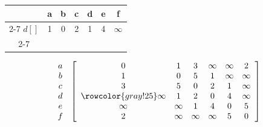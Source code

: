 \documentclass[12pt,a4paper]{article}
\begin{document}
\begin{minipage}{0.45\textwidth}
\centering

\begin{tabular}{ccccccc}
  & a & b & c & d & e & f \\
\cline{2-7}
$d[]$ & \multicolumn{1}{|c|}{1} & \multicolumn{1}{|c|}{0} & \multicolumn{1}{|c|}{2} & \multicolumn{1}{|c|}{1} & \multicolumn{1}{|c|}{4} & \multicolumn{1}{|c|}{$\infty$} \\
\cline{2-7}
\end{tabular}


\vspace{0.5em}

\[
\begin{array}{c}
a \\ b \\ c \\ d \\ e \\ f
\end{array}
\;
\left[
\begin{array}{cccccc}
0 & 1 & 3 & \infty & \infty & 2 \\
1 & 0 & 5 & 1 & \infty & \infty \\
3 & 5 & 0 & 2 & 1 & \infty \\
\rowcolor{gray!25}
\infty & 1 & 2 & 0 & 4 & \infty \\
\infty & \infty & 1 & 4 & 0 & 5 \\
2 & \infty & \infty & \infty & 5 & 0
\end{array}
\right]
\]
\end{minipage}
\vspace{3cm}
\end{document}
